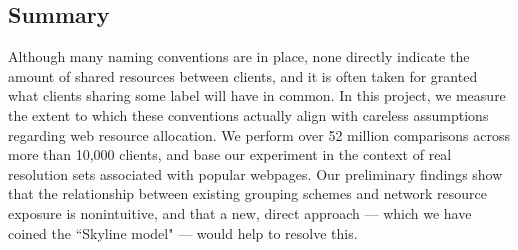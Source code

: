 \subsection{Summary}

Although many naming conventions are in place, none directly indicate the amount of shared resources
between clients, and it is often taken for granted what clients sharing some label will have in
common. In this project, we measure the extent to which these conventions actually align with
careless assumptions regarding web resource allocation. We perform over 52 million comparisons
across more than 10,000 clients, and base our experiment in the context of real resolution sets
associated with popular webpages. Our preliminary findings show that the relationship between
existing grouping schemes and network resource exposure is nonintuitive, and that a new, direct
approach --- which we have coined the ``Skyline model" --- would help to resolve this. 

